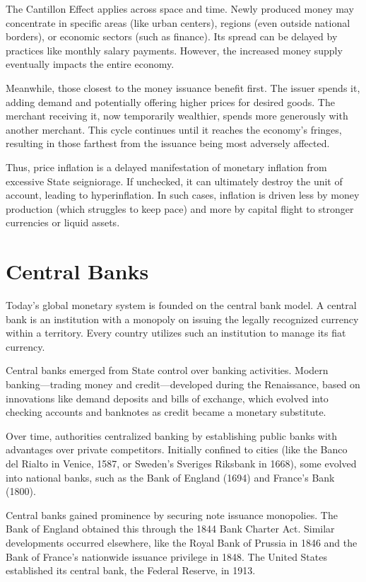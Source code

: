 \documentclass[
  a5paper,
  smalldemyvopaper,10pt,twoside,onecolumn,openright,extrafontsizes,hidelinks]{memoir}
\begin{document}
The Cantillon Effect applies across space and time. Newly produced money
may concentrate in specific areas (like urban centers), regions (even
outside national borders), or economic sectors (such as finance). Its
spread can be delayed by practices like monthly salary payments.
However, the increased money supply eventually impacts the entire
economy.

Meanwhile, those closest to the money issuance benefit first. The issuer
spends it, adding demand and potentially offering higher prices for
desired goods. The merchant receiving it, now temporarily wealthier,
spends more generously with another merchant. This cycle continues until
it reaches the economy's fringes, resulting in those farthest from the
issuance being most adversely affected.

Thus, price inflation is a delayed manifestation of monetary inflation
from excessive State seigniorage. If unchecked, it can ultimately
destroy the unit of account, leading to hyperinflation. In such cases,
inflation is driven less by money production (which struggles to keep
pace) and more by capital flight to stronger currencies or liquid
assets.

\section*{Central Banks}\label{les-banques-centrales}


Today's global monetary system is founded on the central bank model. A
central bank is an institution with a monopoly on issuing the legally
recognized currency within a territory. Every country utilizes such an
institution to manage its fiat currency.

Central banks emerged from State control over banking activities. Modern
banking---trading money and credit---developed during the Renaissance,
based on innovations like demand deposits and bills of exchange, which
evolved into checking accounts and banknotes as credit became a monetary
substitute.

Over time, authorities centralized banking by establishing public banks
with advantages over private competitors. Initially confined to cities
(like the Banco del Rialto in Venice, 1587, or Sweden's Sveriges
Riksbank in 1668), some evolved into national banks, such as the Bank of
England (1694) and France's Bank (1800).

Central banks gained prominence by securing note issuance monopolies.
The Bank of England obtained this through the 1844 Bank Charter Act.
Similar developments occurred elsewhere, like the Royal Bank of Prussia
in 1846 and the Bank of France's nationwide issuance privilege in 1848.
The United States established its central bank, the Federal Reserve, in
1913.
\end{document}
